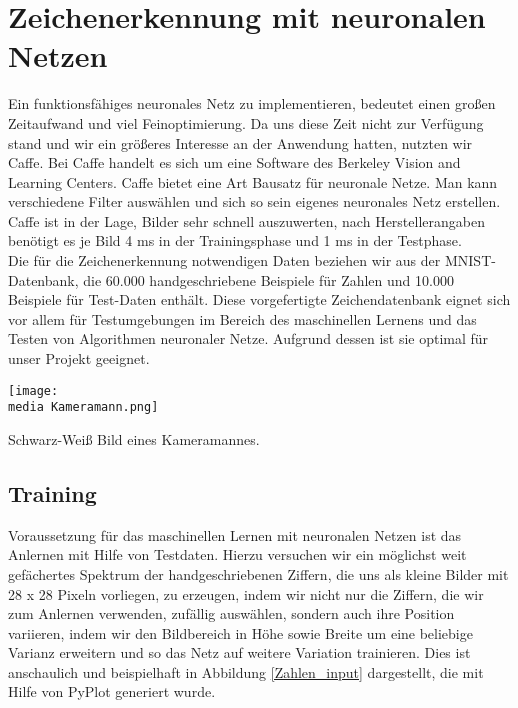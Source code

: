 \section{Zeichenerkennung mit neuronalen Netzen}
Ein funktionsfähiges neuronales Netz zu implementieren, bedeutet einen großen Zeitaufwand und viel Feinoptimierung. Da uns diese Zeit nicht zur Verfügung stand und wir ein größeres Interesse an der Anwendung hatten, nutzten wir Caffe. Bei Caffe handelt es sich um eine Software des Berkeley Vision and Learning Centers. Caffe bietet eine Art Bausatz für neuronale Netze. Man kann verschiedene Filter auswählen und sich so sein eigenes neuronales Netz erstellen. Caffe ist in der Lage, Bilder sehr schnell auszuwerten, nach Herstellerangaben benötigt es je Bild 4 ms in der Trainingsphase und 1 ms in der Testphase. \\
Die für die Zeichenerkennung notwendigen Daten beziehen wir aus der MNIST-Datenbank, die 60.000 handgeschriebene Beispiele für Zahlen und 10.000 Beispiele für Test-Daten enthält. Diese vorgefertigte Zeichendatenbank eignet sich vor allem für Testumgebungen im Bereich des maschinellen Lernens und das Testen von Algorithmen neuronaler Netze. Aufgrund dessen ist sie optimal für unser Projekt geeignet.
\begin{dsafigure}
\begin{center}
	\texttt{[image: \\media Kameramann.png]}
	\caption{Schwarz-Weiß Bild eines Kameramannes.}
	\label{Kameramann}
\end{center}
\end{dsafigure}

\subsection{Training}
Voraussetzung für das maschinellen Lernen mit neuronalen Netzen ist das Anlernen mit Hilfe von Testdaten. Hierzu versuchen wir ein möglichst weit gefächertes Spektrum der handgeschriebenen Ziffern, die uns als kleine Bilder mit 28 x 28 Pixeln vorliegen, zu erzeugen, indem wir nicht nur die Ziffern, die wir zum Anlernen verwenden, zufällig auswählen, sondern auch ihre Position variieren, indem wir den Bildbereich in Höhe sowie Breite um eine beliebige Varianz erweitern und so das Netz auf weitere Variation trainieren. Dies ist anschaulich und beispielhaft in Abbildung  \ref{Zahlen_input} dargestellt, die mit Hilfe von PyPlot generiert wurde.\\

